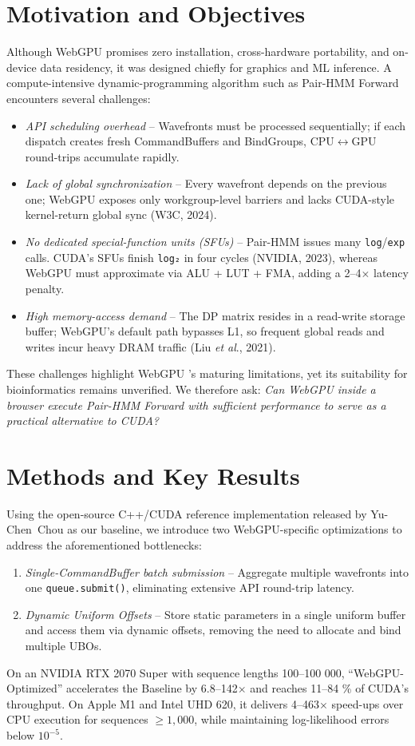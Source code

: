 \documentclass[PhD]{PHlab-thesis}
\begin{document}
\section{Motivation and Objectives}
Although WebGPU promises zero installation, cross-hardware portability, and on-device data residency, it was designed chiefly for graphics and ML inference. A compute-intensive dynamic-programming algorithm such as Pair-HMM Forward encounters several challenges:
\begin{itemize}
    \item \emph{API scheduling overhead} – Wavefronts must be processed sequentially; if each dispatch creates fresh CommandBuffers and BindGroups, CPU$\leftrightarrow$GPU round-trips accumulate rapidly.
    \item \emph{Lack of global synchronization} – Every wavefront depends on the previous one; WebGPU exposes only workgroup-level barriers and lacks CUDA-style kernel-return global sync (W3C, 2024).
    \item \emph{No dedicated special-function units (SFUs)} – Pair-HMM issues many \texttt{log}/\texttt{exp} calls. CUDA's SFUs finish \texttt{log₂} in four cycles (NVIDIA, 2023), whereas WebGPU must approximate via ALU + LUT + FMA, adding a 2–4$\times$ latency penalty.
    \item \emph{High memory-access demand} – The DP matrix resides in a read-write storage buffer; WebGPU's default path bypasses L1, so frequent global reads and writes incur heavy DRAM traffic (Liu \emph{et al}., 2021).
\end{itemize}
These challenges highlight WebGPU 's maturing limitations, yet its suitability for bioinformatics remains unverified. We therefore ask: \emph{Can WebGPU inside a browser execute Pair-HMM Forward with sufficient performance to serve as a practical alternative to CUDA?}

\section{Methods and Key Results}
Using the open-source C++/CUDA reference implementation released by Yu-Chen~Chou \cite{chou2024} as our baseline, we introduce two WebGPU-specific optimizations to address the aforementioned bottlenecks:

\begin{enumerate}
    \item \emph{Single-CommandBuffer batch submission} – Aggregate multiple wavefronts into one \texttt{queue.submit()}, eliminating extensive API round-trip latency.
    \item \emph{Dynamic Uniform Offsets} – Store static parameters in a single uniform buffer and access them via dynamic offsets, removing the need to allocate and bind multiple UBOs.
\end{enumerate}
On an NVIDIA RTX 2070 Super with sequence lengths 100–100 000, “WebGPU-Optimized” accelerates the Baseline by 6.8–142$\times$ and reaches 11–84 \% of CUDA's throughput. On Apple M1 and Intel UHD 620, it delivers 4–463$\times$ speed-ups over CPU execution for sequences \(\ge 1{,}000\), while maintaining log-likelihood errors below \(10^{-5}\).
\end{document}
